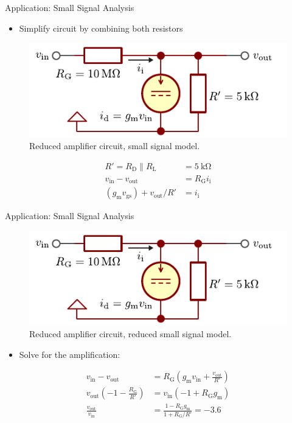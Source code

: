 \begin{frame}{Application: Small Signal Analysis}
    \begin{itemize}
        \item Simplify circuit by combining both resistors
    \end{itemize}
    \begin{figure}
        \centering
        \includegraphics{../assets/mosfet_amplifier_small_signal_reduced.pdf}
        \caption{Reduced amplifier circuit, small signal model.}
        \label{fig:mosfet_amplifier_ac_2}
    \end{figure}

    \begin{align*}
        R'=R_\mathrm{D} \parallel R_\mathrm{L} &= \qty{5}{\kilo \ohm} \\
        v_{\mathrm{in}}-v_{\mathrm{out}}&=R_{\mathrm{G}} i_{\mathrm{i}} \\
        (g_{\mathrm{m}}v_{\mathrm{gs}})+v_{\mathrm{out}} /R'&=i_{\mathrm{i}}
    \end{align*}
\end{frame}

\begin{frame}{Application: Small Signal Analysis}
    \begin{figure}
        \centering
        \includegraphics{../assets/mosfet_amplifier_small_signal_reduced.pdf}
        \caption{Reduced amplifier circuit, reduced small signal model.}
        \label{fig:mosfet_amplifier_ac_reduced}
    \end{figure}
    \begin{itemize}
        \item Solve for the amplification:
    \end{itemize}
    \begin{align*}
        v_{\mathrm{in}}-v_{\mathrm{out}}&=R_{\mathrm{G}}\left( g_{\mathrm{m}}v_{\mathrm{in}}+\frac{v_{\mathrm{out}}}{R'} \right) \\
        v_{\mathrm{out}}\left( -1-\frac{R_{\mathrm{G}}}{R'} \right)&=v_{\mathrm{in}}(-1+R_{\mathrm{G}}g_{\mathrm{m}}) \\
        \frac{v_{\mathrm{out}}}{v_{\mathrm{in}}}&=\frac{1-R_{\mathrm{G}}g_{\mathrm{m}}}{1+R_{\mathrm{G}} / R'}=\num{-3.6}
    \end{align*}
\end{frame}